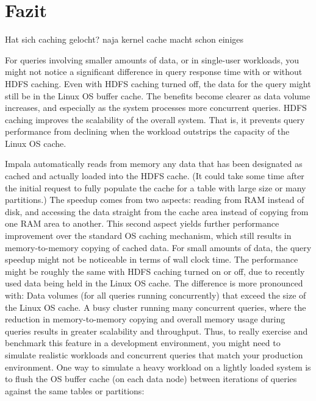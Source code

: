 \documentclass[
  a4paper,
  twocolumn
]{scrartcl}
\begin{document}
\lipsum[1-2]

\section{Fazit}

Hat sich caching gelocht? naja kernel cache macht schon einiges

For queries involving smaller amounts of data, or in single-user workloads, you might not notice a significant difference in query response time with or without HDFS caching. Even with HDFS caching turned off, the data for the query might still be in the Linux OS buffer cache. The benefits become clearer as data volume increases, and especially as the system processes more concurrent queries. HDFS caching improves the scalability of the overall system. That is, it prevents query performance from declining when the workload outstrips the capacity of the Linux OS cache.

Impala automatically reads from memory any data that has been designated as cached and actually loaded into the HDFS cache. (It could take some time after the initial request to fully populate the cache for a table with large size or many partitions.) The speedup comes from two aspects: reading from RAM instead of disk, and accessing the data straight from the cache area instead of copying from one RAM area to another. This second aspect yields further performance improvement over the standard OS caching mechanism, which still results in memory-to-memory copying of cached data.
For small amounts of data, the query speedup might not be noticeable in terms of wall clock time. The performance might be roughly the same with HDFS caching turned on or off, due to recently used data being held in the Linux OS cache. The difference is more pronounced with:
Data volumes (for all queries running concurrently) that exceed the size of the Linux OS cache.
A busy cluster running many concurrent queries, where the reduction in memory-to-memory copying and overall memory usage during queries results in greater scalability and throughput.
Thus, to really exercise and benchmark this feature in a development environment, you might need to simulate realistic workloads and concurrent queries that match your production environment.
One way to simulate a heavy workload on a lightly loaded system is to flush the OS buffer cache (on each data node) between iterations of queries against the same tables or partitions:






\clearpage
\appendix   

\newpage

\nocite{*}
\end{document}
